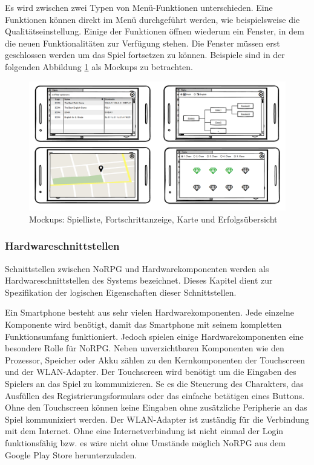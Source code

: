 			Es wird zwischen zwei Typen von Menü-Funktionen unterschieden. Eine Funktionen können direkt im Menü durchgeführt werden, wie beispielsweise die Qualitätseinstellung. Einige der Funktionen öffnen wiederum ein Fenster, in dem die neuen Funktionalitäten zur Verfügung stehen. Die Fenster müssen erst geschlossen werden um das Spiel fortsetzen zu können. Beispiele sind in der folgenden Abbildung \ref{mockupFenster} als Mockups zu betrachten.
			
			\begin{figure}[htbp]
				\centering 
				\label{mockupFenster}
				\includegraphics[width=\textwidth]{pics/NewWindows.png}
				\caption{Mockups: Spielliste, Fortschrittanzeige, Karte und Erfolgsübersicht}
			\end{figure}
		
		\subsubsection{Hardwareschnittstellen}
			Schnittstellen zwischen NoRPG und Hardwarekomponenten werden als Hardwareschnittstellen des Systems bezeichnet. Dieses Kapitel dient zur Spezifikation der logischen Eigenschaften dieser Schnittstellen.
			
			Ein Smartphone besteht aus sehr vielen Hardwarekomponenten. Jede einzelne Komponente wird benötigt, damit das Smartphone mit seinem kompletten Funktionsumfang funktioniert. Jedoch spielen einige Hardwarekomponenten eine besondere Rolle für NoRPG. Neben unverzichtbaren Komponenten wie den Prozessor, Speicher oder Akku zählen zu den Kernkomponenten der Touchscreen und der WLAN-Adapter.	Der Touchscreen wird benötigt um die Eingaben des Spielers an das Spiel zu kommunizieren. Se es die Steuerung des Charakters, das Ausfüllen des Registrierungsformulars oder das einfache betätigen eines Buttons. Ohne den Touchscreen können keine Eingaben ohne zusätzliche Peripherie an das Spiel kommuniziert werden. Der WLAN-Adapter ist zuständig für die Verbindung mit dem Internet. Ohne eine Internetverbindung ist nicht einmal der Login funktionsfähig bzw. es wäre nicht ohne Umstände möglich NoRPG aus dem Google Play Store herunterzuladen.
			
